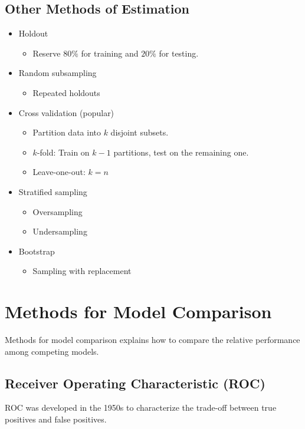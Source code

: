 \subsection{Other Methods of Estimation}
\begin{itemize}
    \item Holdout
    \begin{itemize}
        \item Reserve $80\%$ for training and $20\%$ for testing.
    \end{itemize}
    \item Random subsampling
    \begin{itemize}
        \item Repeated holdouts
    \end{itemize}
    \item Cross validation (popular)
    \begin{itemize}
        \item Partition data into $k$ disjoint subsets.
        \item $k$-fold: Train on $k-1$ partitions, test on the remaining one.
        \item Leave-one-out: $k=n$
    \end{itemize}
    \item Stratified sampling
    \begin{itemize}
        \item Oversampling
        \item Undersampling
    \end{itemize}
    \item Bootstrap
    \begin{itemize}
        \item Sampling with replacement
    \end{itemize}
\end{itemize}

\newpage
\section{Methods for Model Comparison}
Methods for model comparison explains how to compare the relative performance among competing models.

\subsection{Receiver Operating Characteristic (ROC)}
ROC was developed in the 1950s to characterize the trade-off between true positives and false positives.

